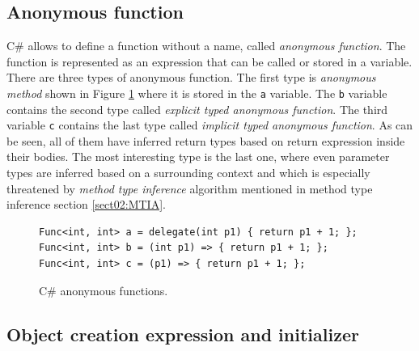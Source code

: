 \subsection*{Anonymous function}

C\# allows to define a function without a name, called \textit{anonymous function}.
The function is represented as an expression that can be called or stored in a variable.
There are three types of anonymous function.
The first type is \textit{anonymous method} shown in Figure \ref{img06:anonymousF} where it is stored in the \texttt{a} variable.
The \texttt{b} variable contains the second type called \textit{explicit typed anonymous function}.
The third variable \texttt{c} contains the last type called \textit{implicit typed anonymous function}.
As can be seen, all of them have inferred return types based on return expression inside their bodies.
The most interesting type is the last one, where even parameter types are inferred based on a surrounding context and which is especially threatened by \textit{method type inference} algorithm mentioned in method type inference section \ref{sect02:MTIA}.
\begin{figure}[h]
\begin{lstlisting}[style=csharp]
Func<int, int> a = delegate(int p1) { return p1 + 1; };
Func<int, int> b = (int p1) => { return p1 + 1; };
Func<int, int> c = (p1) => { return p1 + 1; };
\end{lstlisting}
\caption{C\# anonymous functions.}
\label{img06:anonymousF}
\end{figure}

\subsection*{Object creation expression and initializer}

